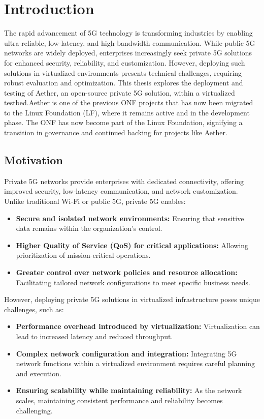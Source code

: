 \chapter{Introduction}
\label{ch:introduction}

The rapid advancement of 5G technology is transforming industries by enabling ultra-reliable, low-latency, and high-bandwidth communication. While public 5G networks are widely deployed, enterprises increasingly seek private 5G solutions for enhanced security, reliability, and customization. However, deploying such solutions in virtualized environments presents technical challenges, requiring robust evaluation and optimization. This thesis explores the deployment and testing of Aether, an open-source private 5G solution, within a virtualized testbed.Aether is one of the previous ONF projects that has now been migrated to the Linux Foundation (LF), where it remains active and in the development phase. The ONF has now become part of the Linux Foundation, signifying a transition in governance and continued backing for projects like Aether.

\section{Motivation}

Private 5G networks provide enterprises with dedicated connectivity, offering improved security, low-latency communication, and network customization. Unlike traditional Wi-Fi or public 5G, private 5G enables:

\begin{itemize}
    \item \textbf{Secure and isolated network environments:} Ensuring that sensitive data remains within the organization's control.
    \item \textbf{Higher Quality of Service (QoS) for critical applications:} Allowing prioritization of mission-critical operations.
    \item \textbf{Greater control over network policies and resource allocation:} Facilitating tailored network configurations to meet specific business needs.
\end{itemize}
\clearpage
However, deploying private 5G solutions in virtualized infrastructure poses unique challenges, such as:

\begin{itemize}
    \item \textbf{Performance overhead introduced by virtualization:} Virtualization can lead to increased latency and reduced throughput.
    \item \textbf{Complex network configuration and integration:} Integrating 5G network functions within a virtualized environment requires careful planning and execution.
    \item \textbf{Ensuring scalability while maintaining reliability:} As the network scales, maintaining consistent performance and reliability becomes challenging.
\end{itemize}

